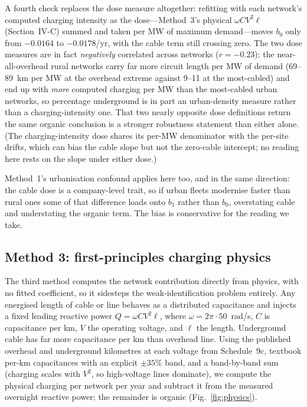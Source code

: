 \documentclass[journal]{IEEEtran}
\begin{document}
A fourth check replaces the dose measure altogether: refitting with each
network's computed charging intensity as the dose---Method~3's physical
$\omega C V^2 \ell$ (Section~IV-C) summed and taken per MW of maximum
demand---moves $b_0$ only from $-0.0164$ to $-0.0178$/yr, with the cable term
still crossing zero. The two dose measures are in fact \emph{negatively}
correlated across networks ($r=-0.23$): the near-all-overhead rural networks
carry far more circuit length per MW of demand (69--89~km per MW at the
overhead extreme against 9--11 at the most-cabled) and end up with \emph{more}
computed charging per MW than the most-cabled urban networks, so percentage
underground is in part an urban-density measure rather than a
charging-intensity one. That two nearly opposite dose definitions return the
same organic conclusion is a stronger robustness statement than either alone.
(The charging-intensity dose shares its per-MW denominator with the per-site
drifts, which can bias the cable slope but not the zero-cable intercept; no
reading here rests on the slope under either dose.)

Method~1's urbanisation confound applies here too, and in the same
direction: the cable dose is a company-level trait, so if urban fleets modernise
faster than rural ones some of that difference loads onto $b_1$ rather than
$b_0$, overstating cable and understating the organic term. The bias is
conservative for the reading we take.

\subsection{Method 3: first-principles charging physics}
The third method computes the network contribution directly from physics, with no
fitted coefficient, so it sidesteps the weak-identification problem entirely. Any
energised length of cable or line behaves as a distributed capacitance and injects
a fixed leading reactive power $Q=\omega C V^2 \ell$, where $\omega=2\pi\cdot
50$~rad/s, $C$ is capacitance per km, $V$ the operating voltage, and $\ell$ the
length. Underground cable has far more capacitance per km than overhead line. Using
the published overhead and underground kilometres at each voltage from
Schedule~9c, textbook per-km capacitances with an explicit $\pm 35\%$ band, and a
band-by-band sum (charging scales with $V^2$, so high-voltage lines dominate), we
compute the physical charging per network per year and subtract it from the
measured overnight reactive power; the remainder is organic
(Fig.~\ref{fig:physics}).
\end{document}
